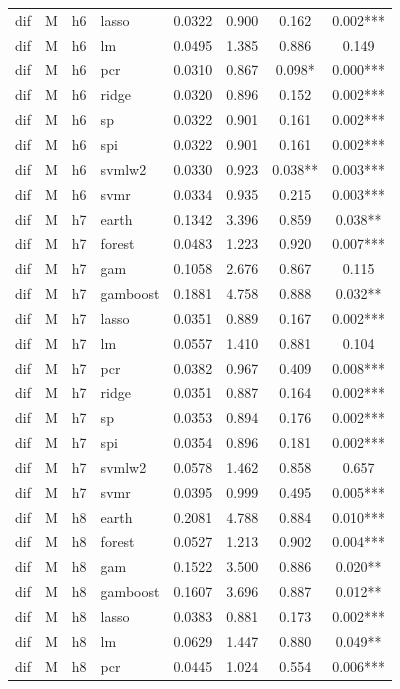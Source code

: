 \begin{ThreePartTable}
\begin{longtable}[t]{llclcccc}
dif & M & h6 & lasso & 0.0322 & 0.900 & 0.162 & 0.002***\\
dif & M & h6 & lm & 0.0495 & 1.385 & 0.886 & 0.149\\
dif & M & h6 & pcr & 0.0310 & 0.867 & 0.098* & 0.000***\\
dif & M & h6 & ridge & 0.0320 & 0.896 & 0.152 & 0.002***\\
dif & M & h6 & sp & 0.0322 & 0.901 & 0.161 & 0.002***\\
dif & M & h6 & spi & 0.0322 & 0.901 & 0.161 & 0.002***\\
dif & M & h6 & svmlw2 & 0.0330 & 0.923 & 0.038** & 0.003***\\
dif & M & h6 & svmr & 0.0334 & 0.935 & 0.215 & 0.003***\\
\addlinespace
dif & M & h7 & earth & 0.1342 & 3.396 & 0.859 & 0.038**\\
dif & M & h7 & forest & 0.0483 & 1.223 & 0.920 & 0.007***\\
dif & M & h7 & gam & 0.1058 & 2.676 & 0.867 & 0.115\\
dif & M & h7 & gamboost & 0.1881 & 4.758 & 0.888 & 0.032**\\
dif & M & h7 & lasso & 0.0351 & 0.889 & 0.167 & 0.002***\\
dif & M & h7 & lm & 0.0557 & 1.410 & 0.881 & 0.104\\
dif & M & h7 & pcr & 0.0382 & 0.967 & 0.409 & 0.008***\\
dif & M & h7 & ridge & 0.0351 & 0.887 & 0.164 & 0.002***\\
dif & M & h7 & sp & 0.0353 & 0.894 & 0.176 & 0.002***\\
dif & M & h7 & spi & 0.0354 & 0.896 & 0.181 & 0.002***\\
dif & M & h7 & svmlw2 & 0.0578 & 1.462 & 0.858 & 0.657\\
dif & M & h7 & svmr & 0.0395 & 0.999 & 0.495 & 0.005***\\
\addlinespace
dif & M & h8 & earth & 0.2081 & 4.788 & 0.884 & 0.010***\\
dif & M & h8 & forest & 0.0527 & 1.213 & 0.902 & 0.004***\\
dif & M & h8 & gam & 0.1522 & 3.500 & 0.886 & 0.020**\\
dif & M & h8 & gamboost & 0.1607 & 3.696 & 0.887 & 0.012**\\
dif & M & h8 & lasso & 0.0383 & 0.881 & 0.173 & 0.002***\\
dif & M & h8 & lm & 0.0629 & 1.447 & 0.880 & 0.049**\\
dif & M & h8 & pcr & 0.0445 & 1.024 & 0.554 & 0.006***\\

\end{longtable}
\end{ThreePartTable}
